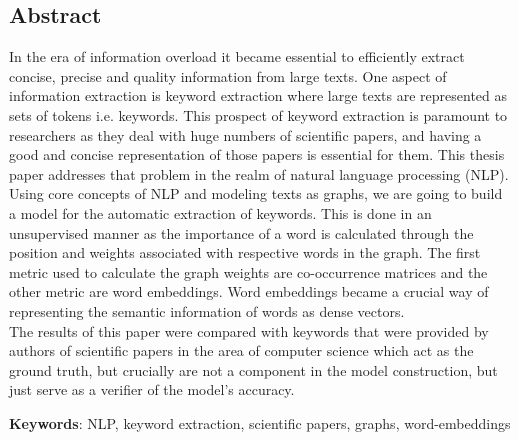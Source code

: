 \documentclass[12pt]{article}
\numberwithin{equation}{section}
\begin{document}
	\begin{spacing}{1.5}
	\section*{Abstract}
	In the era of information overload it became essential to efficiently extract concise, precise and quality information from large texts. One aspect of information extraction is keyword extraction where large texts are represented as sets of tokens i.e. keywords. This prospect of keyword extraction is paramount to researchers as they deal with huge numbers of scientific papers, and having a good and concise representation of those papers is essential for them. This thesis paper addresses that problem in the realm of natural language processing (NLP). \\
	Using core concepts of NLP and modeling texts as graphs, we are going to build a model for the automatic extraction of keywords. This is done in an unsupervised manner as the importance of a word is calculated through the position and weights associated with respective words in the graph. The first metric used to calculate the graph weights are co-occurrence matrices and the other metric are word embeddings. Word embeddings became a crucial way of representing the semantic information of words as dense vectors. \\
	The results of this paper were compared with keywords that were provided by authors of scientific papers in the area of computer science which act as the ground truth, but crucially are not a component in the model construction, but just serve as a verifier of the model's accuracy.
	
	\textbf{Keywords}: NLP, keyword extraction, scientific papers, graphs, word-embeddings
	
	\newpage
	\pagestyle{empty}
	\tableofcontents
	\setcounter{page}{0}
	\newpage
	\listoffigures
	\setcounter{page}{0}
	
	\listoftables
    \setcounter{page}{0}
	\pagebreak
	
	\newpage
	\pagestyle{fancy}

\end{spacing}
\end{document}
